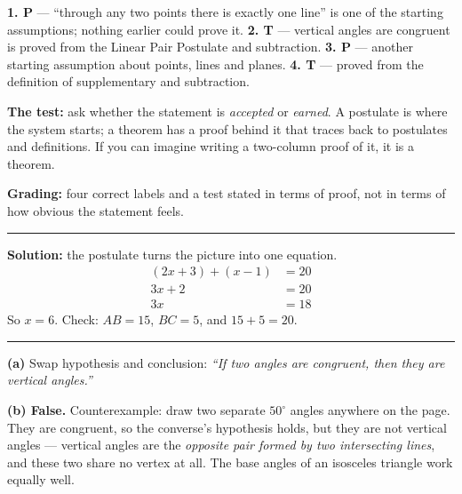 \documentclass[12pt]{article}
\begin{document}



\textbf{1. P} --- ``through any two points there is exactly one line'' is one of the starting assumptions; nothing earlier could prove it. \quad \textbf{2. T} --- vertical angles are congruent is proved from the Linear Pair Postulate and subtraction. \quad \textbf{3. P} --- another starting assumption about points, lines and planes. \quad \textbf{4. T} --- proved from the definition of supplementary and subtraction.

\textbf{The test:} ask whether the statement is \emph{accepted} or \emph{earned}. A postulate is where the system starts; a theorem has a proof behind it that traces back to postulates and definitions. If you can imagine writing a two-column proof of it, it is a theorem.

\textbf{Grading:} four correct labels and a test stated in terms of proof, not in terms of how obvious the statement feels.

\vspace{0.2cm}\noindent\rule{\linewidth}{0.2pt}


\textbf{Solution:} the postulate turns the picture into one equation.
\begin{align*}
  (2x + 3) + (x - 1) &= 20 \\
  3x + 2 &= 20 \\
  3x &= 18
\end{align*}
So $x = 6$. Check: $AB = 15$, $BC = 5$, and $15 + 5 = 20$. 

\vspace{0.2cm}\noindent\rule{\linewidth}{0.2pt}


\textbf{(a)} Swap hypothesis and conclusion: \emph{``If two angles are congruent, then they are vertical angles.''}

\textbf{(b) False.} Counterexample: draw two separate $50^\circ$ angles anywhere on the page. They are congruent, so the converse's hypothesis holds, but they are not vertical angles --- vertical angles are the \emph{opposite pair formed by two intersecting lines}, and these two share no vertex at all. The base angles of an isosceles triangle work equally well.
\end{document}
